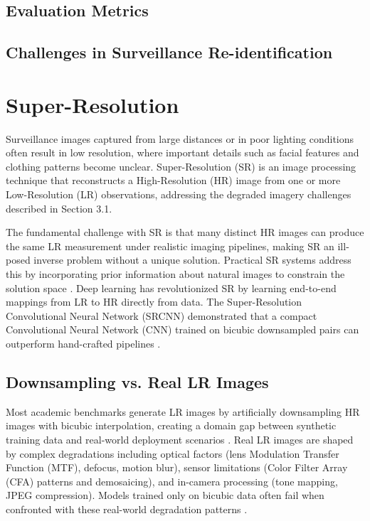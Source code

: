 \subsection{Evaluation Metrics}


\subsection{Challenges in Surveillance Re-identification}


\section{Super-Resolution}
\label{sec:SuperResolution}

Surveillance images captured from large distances or in poor lighting conditions often result in low resolution, where important details such as facial features and clothing patterns become unclear. Super-Resolution (SR) is an image processing technique that reconstructs a High-Resolution (HR) image from one or more Low-Resolution (LR) observations, addressing the degraded imagery challenges described in Section 3.1.

The fundamental challenge with SR is that many distinct HR images can produce the same LR measurement under realistic imaging pipelines, making SR an ill-posed inverse problem without a unique solution. Practical SR systems address this by incorporating prior information about natural images to constrain the solution space \cite{Wang2019Survey,Farsiu2004Survey}. Deep learning has revolutionized SR by learning end-to-end mappings from LR to HR directly from data. The Super-Resolution Convolutional Neural Network (SRCNN) demonstrated that a compact Convolutional Neural Network (CNN) trained on bicubic downsampled pairs can outperform hand-crafted pipelines \cite{dong2015imagesuperresolutionusingdeep}.

\subsection{Downsampling vs. Real LR Images}
\label{subsec:DownsamplingVsReal}

Most academic benchmarks generate LR images by artificially downsampling HR images with bicubic interpolation, creating a domain gap between synthetic training data and real-world deployment scenarios \cite{Agustsson2017NTIRE,Timofte2017NTIRE}. Real LR images are shaped by complex degradations including optical factors (lens Modulation Transfer Function (MTF), defocus, motion blur), sensor limitations (Color Filter Array (CFA) patterns and demosaicing), and in-camera processing (tone mapping, JPEG compression). Models trained only on bicubic data often fail when confronted with these real-world degradation patterns \cite{Cai2019RealSR,Wei2020DRealSR}.

